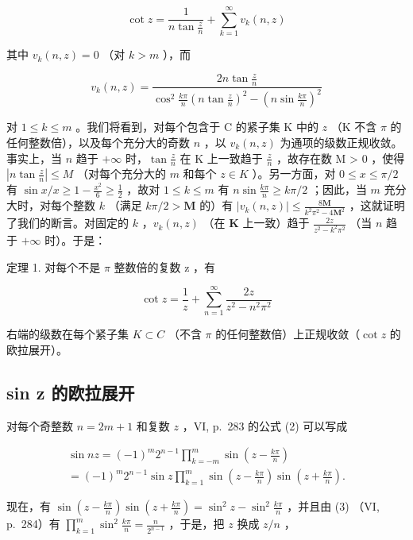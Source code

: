 \[
\cot z = \frac {1}{n \tan \frac {z}{n}} + \sum_ {k = 1} ^ {\infty} v _ {k} (n, z)
\]

其中 \(v_{k}(n,z) = 0\) （对 \(k > m\) ），而

\[
v _ {k} (n, z) = \frac {2 n \tan \frac {z}{n}}{\cos^ {2} \frac {k \pi}{n} \left(n \tan \frac {z}{n}\right) ^ {2} - \left(n \sin \frac {k \pi}{n}\right) ^ {2}}
\]

对 \(1 \leqslant k \leqslant m\) 。我们将看到，对每个包含于 C 的紧子集 K 中的 \(z\) （K 不含 \(\pi\) 的任何整数倍），以及每个充分大的奇数 \(n\) ，以 \(v_{k}(n,z)\) 为通项的级数正规收敛。事实上，当 \(n\) 趋于 \(+\infty\) 时，\(\tan \frac{z}{n}\) 在 K 上一致趋于 \(\frac{z}{n}\) ，故存在数 M \textgreater{} 0 ，使得 \(\left| n \tan \frac{z}{n} \right| \leqslant M\) （对每个充分大的 \(m\) 和每个 \(z \in K\) ）。另一方面，对 \(0 \leqslant x \leqslant \pi/2\) 有 \(\sin x/x \geqslant 1 - \frac{x^2}{6} \geqslant \frac{1}{2}\) ，故对 \(1 \leqslant k \leqslant m\) 有 \(n \sin \frac{k\pi}{n} \geqslant k\pi/2\) ；因此，当 \(m\) 充分大时，对每个整数 \(k\) （满足 \(k\pi / 2 > \mathbf{M}\) 的）有 \(|v_k(n, z)| \leqslant \frac{8\mathbf{M}}{k^2\pi^2 - 4\mathbf{M}^2}\) ，这就证明了我们的断言。对固定的 \(k\) ，\(v_k(n, z)\) （在 \(\mathbf{K}\) 上一致）趋于 \(\frac{2z}{z^2 - k^2\pi^2}\) （当 \(n\) 趋于 \(+\infty\) 时）。于是：

定理 1. 对每个不是 \(\pi\) 整数倍的复数 z ，有

\[
\cot z = \frac {1}{z} + \sum_ {n = 1} ^ {\infty} \frac {2 z}{z ^ {2} - n ^ {2} \pi^ {2}}\tag{8}
\]

右端的级数在每个紧子集 \(K \subset C\) （不含 \(\pi\) 的任何整数倍）上正规收敛（\(\cot z\) 的欧拉展开）。

\subsection{sin z 的欧拉展开}

对每个奇整数 \(n = 2m + 1\) 和复数 \(z\) ，VI, p.~283 的公式 (2) 可以写成

\[
\begin{array}{l} \sin n z = (- 1) ^ {m}   2 ^ {n - 1}   \prod_ {k = - m} ^ {m}   \sin \left(z - \frac {k \pi}{n}\right) \\ = (- 1) ^ {m}   2 ^ {n - 1}   \sin z   \prod_ {k = 1} ^ {m}   \sin \left(z - \frac {k \pi}{n}\right) \sin \left(z + \frac {k \pi}{n}\right). \end{array}
\]

现在，有 \(\sin\left(z-\frac{k\pi}{n}\right)\sin\left(z+\frac{k\pi}{n}\right)=\sin^{2}z-\sin^{2}\frac{k\pi}{n}\) ，并且由 (3) （VI, p.~284）有 \(\prod_{k=1}^{m}\sin^{2}\frac{k\pi}{n}=\frac{n}{2^{n-1}}\) ，于是，把 \(z\) 换成 \(z/n\) ，

